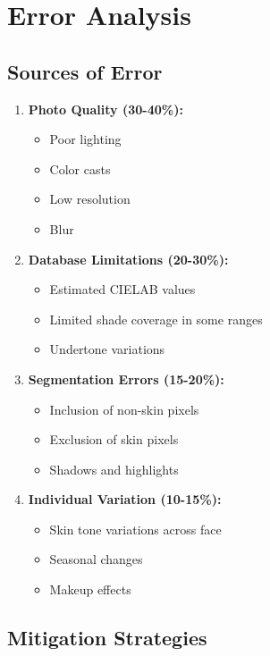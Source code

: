 \section{Error Analysis}

\subsection{Sources of Error}

\begin{enumerate}
    \item \textbf{Photo Quality (30-40\%):}
    \begin{itemize}
        \item Poor lighting
        \item Color casts
        \item Low resolution
        \item Blur
    \end{itemize}
    
    \item \textbf{Database Limitations (20-30\%):}
    \begin{itemize}
        \item Estimated CIELAB values
        \item Limited shade coverage in some ranges
        \item Undertone variations
    \end{itemize}
    
    \item \textbf{Segmentation Errors (15-20\%):}
    \begin{itemize}
        \item Inclusion of non-skin pixels
        \item Exclusion of skin pixels
        \item Shadows and highlights
    \end{itemize}
    
    \item \textbf{Individual Variation (10-15\%):}
    \begin{itemize}
        \item Skin tone variations across face
        \item Seasonal changes
        \item Makeup effects
    \end{itemize}
\end{enumerate}

\subsection{Mitigation Strategies}

